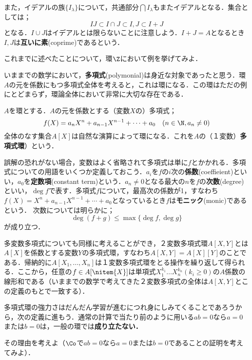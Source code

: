 また，イデアルの族$\{I_\lambda\}$について，共通部分$\bigcap I_\lambda$もまたイデアルとなる．集合としては；
\[IJ\subset I\cap J\subset I,J\subset I+J\]
となる．$I\cup J$はイデアルとは限らないことに注意しよう．$I+J=A$となるとき$I,J$は\textbf{互いに素}(coprime)であるという．


\begin{exer}
	これまでに述べたことについて，環$\Z$において例を挙げてみよ．
\end{exer}

いままでの数学において，\textbf{多項式}(polymonial)は身近な対象であったと思う．環$A$の元を係数にもつ多項式全体を考えると，これは環になる．この環はただの例にとどまらず，環論全体において非常に大切な存在である．

\begin{defi}[多項式環]
	$A$を環とする．$A$の元を係数とする（変数$X$の）多項式；
	\[f(X)=a_nX^n+a_{n-1}X^{n-1}+\dots+a_0\quad(n\in\N,a_n\neq0)\]
	全体のなす集合$A[X]$は自然な演算によって環になる．これを$A$の（１変数）\textbf{多項式環}）という．
\end{defi}
誤解の恐れがない場合，変数はよく省略されて多項式は単に$f$とかかれる．多項式についての用語をいくつか定義しておこう．$a_i$を$f$の$i$次の\textbf{係数}(coeffieient)といい，$a_0$を\textbf{定数項}(constant term)という．$a_n\neq0$となる最大の$n$を$f$の\textbf{次数}(degree)といい，$\deg f$で表す．多項式$f$について，最高次の係数が1，すなわち$f(X)=X^n+a_{n-1}X^{n-1}+\cdots+a_0$となっているとき$f$は\textbf{モニック}(monic)であるという． 次数については明らかに；
\[\deg (f+g)\leq\max\{\deg f,\deg g\}\]
が成り立つ．

多変数多項式についても同様に考えることができ，２変数多項式環$A[X,Y]$とは$A[X]$を係数とする変数$Y$の多項式環，すなわち$A[X,Y]=A[X][Y]$のことである．帰納的に$A[X_1,\dots,X_n]$は１変数多項式環をとる操作を繰り返して得られる．ここから，任意の$f\in A[\nitem{X}]$は単項式$X_1^{k_1}\dots X_n^{k_n} (k_i\geq0)$の$A$係数の線形和である（いままでの数学で考えてきた２変数多項式の全体は$A[X,Y]$とこの定義のもとで一致する）．

多項式環の強力さはだんだん学習が進むにつれ身にしみてくることであろうから，次の定義に進もう．通常の計算で当たり前のように用いる$ab=0$なら$a=0$または$b=0$は，一般の環では\textbf{成り立たない．}

\begin{exer}
	その理由を考えよ（$\Co$で$ab=0$なら$a=0$または$b=0$であることの証明を考えてみよ）．
\end{exer}

